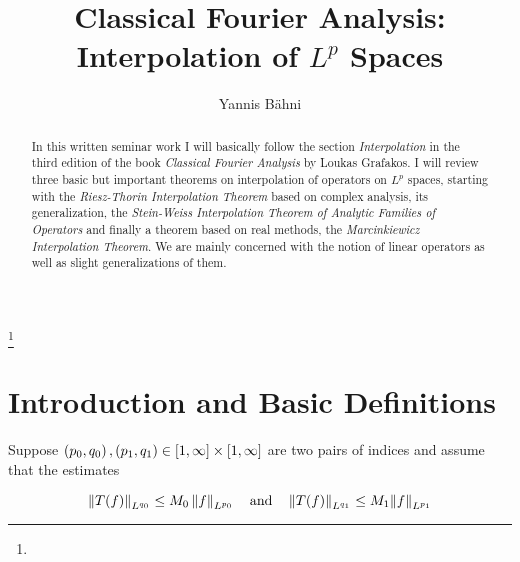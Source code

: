 \documentclass[11pt,oneside,a4paper,final]{amsart}
\theoremstyle{bold}
\begin{document}
\title{Classical Fourier Analysis: Interpolation of $L^p$ Spaces}


\author{Yannis B\"{a}hni}
\address[Yannis B\"{a}hni]{University of Zurich, R\"{a}mistrasse 71, 8006 Zurich}
\curraddr{}
\thanks{}



\keywords{}

\date{}

\dedicatory{}

\begin{abstract}
    In this written seminar work I will basically follow the section
    \emph{Interpolation} in the third edition of the book \emph{Classical Fourier Analysis} by Loukas Grafakos.
    I will review three basic but important theorems on interpolation of operators on $L^p$ spaces, starting with
    the \emph{Riesz-Thorin Interpolation Theorem} based on complex analysis, its generalization,
    the \emph{Stein-Weiss Interpolation Theorem of Analytic Families of Operators} and finally a theorem
    based on real methods, the \emph{Marcinkiewicz Interpolation Theorem}.
    We are mainly concerned with the notion of linear operators as well as slight
    generalizations of them.
\end{abstract}

\maketitle

\tableofcontents

\section{Introduction and Basic Definitions}
Suppose $\del{p_0,q_0},\del{ p_1,q_1} \in \intcc{1,\infty} \times \intcc{1,\infty}$ are two pairs of indices and assume that the estimates

\begin{equation*}
    \norm[0]{T(f)}_{L^{q_0}} \leq M_0 \norm[0]{f}_{L^{p_0}} \quad \text{and} \quad \norm[0]{T(f)}_{L^{q_1}} \leq M_1\norm{f}_{L^{p_1}}
\end{equation*}
\end{document}
